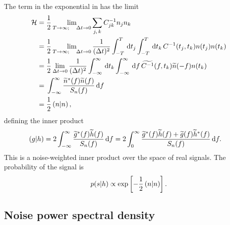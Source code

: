The term in the exponential in  has the limit
\begin{align}
\mathcal{H} = {} & \dfrac{1}{2}\lim_{T \rightarrow \infty; \quad \Delta t \rightarrow 0} \sum_{j,\,k}C^{-1}_{jk}n_j n_k \nonumber \\
 = {} & \dfrac{1}{2}\lim_{T \rightarrow \infty; \quad \Delta t \rightarrow 0} \dfrac{1}{(\Delta t)^2}\int_{-T}^{T}\,\mathrm{d} t_j \int_{-T}^{T}\,\mathrm{d} t_k \, C^{-1}(t_j,t_k) n(t_j)n(t_k) \nonumber \\
 = {} & \dfrac{1}{2}\lim_{\Delta t \rightarrow 0} \dfrac{1}{(\Delta t)^2} \int_{-\infty}^{\infty}\,\mathrm{d} t_k \int_{-\infty}^{\infty}\,\mathrm{d} f \, \widetilde{C^{-1}}(f,t_k)\widetilde{n}(-f)n(t_k) \nonumber \\
 = {} & \int_{-\infty}^{\infty}{\dfrac{\widetilde{n}^\ast(f)\widetilde{n}(f)}{S_n(f)}}\,\mathrm{d}{f} \nonumber \\
 = {} & \dfrac{1}{2}\left({n}\middle|{n}\right),
 \end{align}
defining the inner product \citep{Finn1992}
\begin{align}
\left({g}\middle|{h}\right) = {} & 2\int_{-\infty}^{\infty}{\dfrac{\widetilde{g}^\ast(f)\widetilde{h}(f)}{S_n(f)}}\,\mathrm{d}{f} = 2 \int_{0}^{\infty}{\dfrac{\widetilde{g}^\ast(f)\widetilde{h}(f) + \widetilde{g}(f)\widetilde{h}^\ast(f)}{S_n(f)}}\,\mathrm{d}{f}.
\end{align}
This is a noise-weighted inner product over the space of real signals. The probability of the signal is \citep{Cutler1994}
\begin{equation}
p(s|h) \propto \exp\left[-\dfrac{1}{2}\left({n}\middle|{n}\right)\right].
\end{equation}

\subsection{Noise power spectral density}

